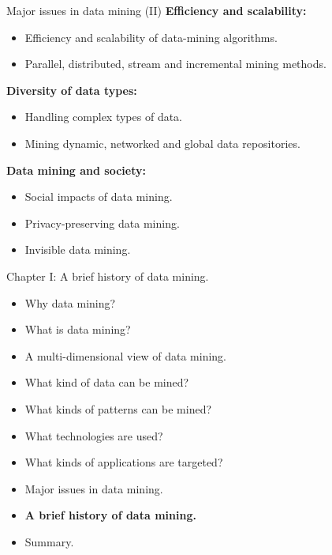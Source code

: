 \documentclass[aspectratio=169,t]{beamer}
\begin{document}
  {
    \begin{frame}{Major issues in data mining (II)}
    \textbf{Efficiency and scalability:}\\
    \begin{itemize}
        \item Efficiency and scalability of data-mining algorithms.
        \item Parallel, distributed, stream and incremental mining methods.
    \end{itemize}
    \textbf{Diversity of data types:}\\
    \begin{itemize}
        \item Handling complex types of data.
        \item Mining dynamic, networked and global data repositories.
    \end{itemize}
    \textbf{Data mining and society:}\\
    \begin{itemize}
        \item Social impacts of data mining.
        \item Privacy-preserving data mining.
        \item Invisible data mining.
    \end{itemize}
    \end{frame}
  }


 { 
    \begin{frame}{Chapter I: A brief history of data mining.}
        \begin{itemize}
            \item Why data mining?
            \item What is data mining?
            \item A multi-dimensional view of data mining.
            \item What kind of data can be mined?
            \item What kinds of patterns can be mined?
            \item What technologies are used?
            \item What kinds of applications are targeted?
            \item Major issues in data mining.
            \item \textbf{A brief history of data mining.}
            \item Summary.
        \end{itemize}
    \end{frame}
  }
\end{document}
